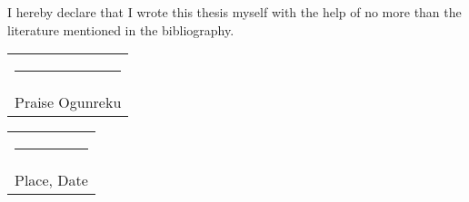 
I hereby declare that I wrote this thesis myself with the help of no more than the literature mentioned in the bibliography.


\vspace*{4em}\noindent
\hfill%
\begin{tabular}[t]{c}
  \rule{10em}{0.4pt}\\ Praise Ogunreku
\end{tabular}%
\hfill%
\begin{tabular}[t]{c}
  \rule{10em}{0.4pt}\\ Place, Date
\end{tabular}%
\hfill\strut
